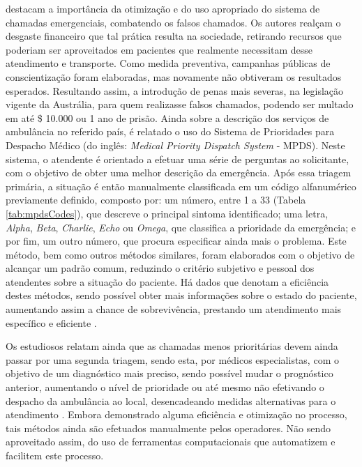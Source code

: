 \cite{rashford2010optimizing} destacam a importância da otimização e do uso apropriado do sistema de chamadas emergenciais, combatendo os falsos chamados. Os autores realçam o desgaste financeiro que tal prática resulta na sociedade, retirando recursos que poderiam ser aproveitados em pacientes que realmente necessitam desse atendimento e transporte. Como medida preventiva, campanhas públicas de conscientização foram elaboradas, mas novamente não obtiveram os resultados esperados. Resultando assim, a introdução de penas mais severas, na legislação vigente da Austrália,  para quem realizasse falsos chamados, podendo ser multado em até \$ 10.000 ou 1 ano de prisão. 
Ainda sobre a descrição dos serviços de ambulância no referido país, é relatado o uso do Sistema de Prioridades para Despacho Médico (do inglês: \textit{Medical Priority Dispatch System} - MPDS). Neste sistema, o atendente é orientado a efetuar uma série de perguntas ao solicitante, com o objetivo de obter uma melhor descrição da emergência. Após essa triagem primária, a situação é então manualmente classificada em um código alfanumérico previamente definido, composto por: um número, entre 1 a 33 (Tabela \ref{tab:mpdsCodes}), que descreve o principal sintoma identificado; uma letra, \textit{Alpha}, \textit{Beta}, \textit{Charlie}, \textit{Echo} ou \textit{Omega}, que classifica a prioridade da emergência; e por fim, um outro número, que procura especificar ainda mais o problema.
Este método, bem como outros métodos similares, foram elaborados com o objetivo de alcançar um padrão comum, reduzindo o critério subjetivo e pessoal dos atendentes sobre a situação do paciente. Há dados que denotam a eficiência destes métodos, sendo possível obter mais informações sobre o estado do paciente, aumentando assim a chance de sobrevivência, prestando um atendimento mais específico e eficiente \citep{gray2008ampds}.

Os estudiosos relatam ainda que as chamadas menos prioritárias devem ainda passar por uma segunda triagem, sendo esta, por médicos especialistas, com o objetivo de um diagnóstico mais preciso, sendo possível mudar o prognóstico anterior, aumentando o nível de prioridade ou até mesmo não efetivando o despacho da ambulância ao local, desencadeando medidas alternativas para o atendimento \citep{marks2002emergency, gray2008ampds}. Embora demonstrado alguma eficiência e otimização no processo, tais métodos ainda são efetuados manualmente pelos operadores. Não sendo aproveitado assim, do uso de ferramentas computacionais que automatizem e facilitem este processo.

